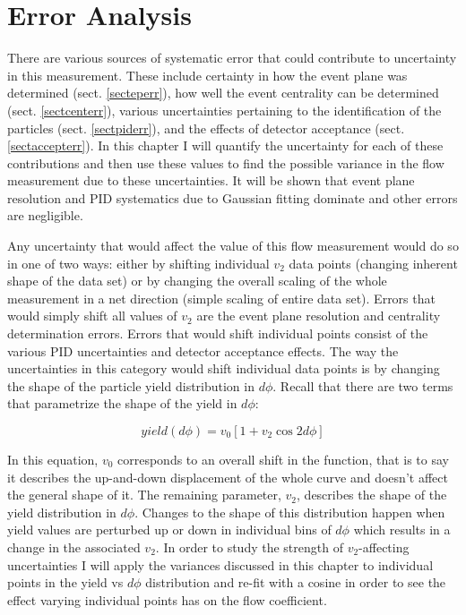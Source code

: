 
\chapter{Error Analysis} %
There are various sources of systematic error that could contribute to uncertainty in this measurement. These include certainty in how the event plane was determined (sect. \ref{secteperr}), how well the event centrality can be determined (sect. \ref{sectcenterr}), various uncertainties pertaining to the identification of the particles (sect. \ref{sectpiderr}), and the effects of detector acceptance (sect. \ref{sectaccepterr}). In this chapter I will quantify the uncertainty for each of these contributions and then use these values to find the possible variance in the flow measurement due to these uncertainties. It will be shown that event plane resolution and PID systematics due to Gaussian fitting dominate and other errors are negligible.

Any uncertainty that would affect the value of this flow measurement would do so in one of two ways: either by shifting individual $v_2$ data points (changing inherent shape of the data set) or by changing the overall scaling of the whole measurement in a net direction (simple scaling of entire data set). Errors that would simply shift all values of $v_2$ are the event plane resolution and centrality determination errors. Errors that would shift individual points consist of the various PID uncertainties and detector acceptance effects. The way the uncertainties in this category would shift individual data points is by changing the shape of the particle yield distribution in $d\phi$. Recall that there are two terms that parametrize the shape of the yield in $d\phi$:

\begin{equation}
yield(d\phi) = v_0 [1 + v_2 \cos 2d\phi]
\end{equation}

In this equation, $v_0$ corresponds to an overall shift in the function, that is to say it describes the up-and-down displacement of the whole curve and doesn't affect the general shape of it. The remaining parameter, $v_2$, describes the shape of the yield distribution in $d\phi$. Changes to the shape of this distribution happen when yield values are perturbed up or down in individual bins of $d\phi$ which results in a change in the associated $v_2$. In order to study the strength of $v_2$-affecting uncertainties I will apply the variances discussed in this chapter to individual points in the yield vs $d\phi$ distribution and re-fit with a cosine in order to see the effect varying individual points has on the flow coefficient. 

